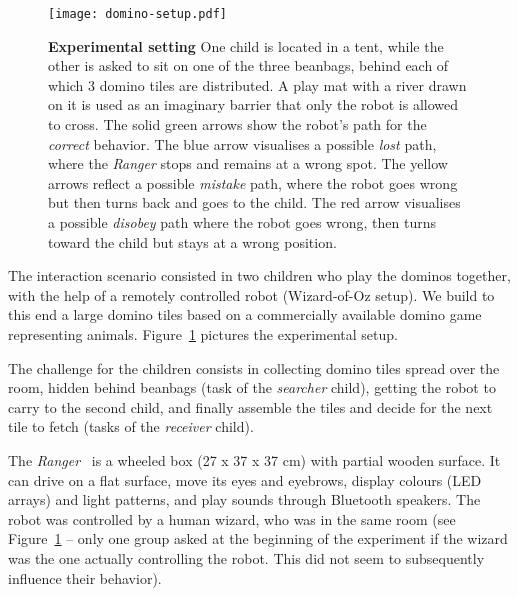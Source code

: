 \documentclass[letterpaper, 10pt, conference]{ieeeconf}
\begin{document}
\begin{figure}[ht!] 
    \centering 
    \texttt{[image: domino-setup.pdf]} 
    \caption{\small \textbf{Experimental setting} One child is located in a
        tent, while the other is asked to sit on one of the three beanbags,
        behind each of which 3 domino tiles are distributed. A play mat with a
        river drawn on it is used as an imaginary barrier that only the robot is
        allowed to cross. The solid green arrows show the robot's path for the
        \textit{correct} behavior. The blue arrow visualises a possible
        \textit{lost} path, where the \emph{Ranger} stops and remains at a wrong spot.
        The yellow arrows reflect a possible \textit{mistake} path, where the
        robot goes wrong but then turns back and goes to the child. The red
        arrow visualises a possible \textit{disobey} path where the robot goes
        wrong, then turns toward the child but stays at a wrong position.} 

    \label{fig:domino-setup} 
\end{figure}


The interaction scenario consisted in two children who play the dominos
together, with the help of a remotely controlled robot (Wizard-of-Oz setup). We
build to this end a large domino tiles based on a commercially available domino
game representing animals.  Figure~\ref{fig:domino-setup} pictures the
experimental setup.

The challenge for the children consists in collecting domino tiles spread over
the room, hidden behind beanbags (task of the \emph{searcher} child), getting
the robot to carry to the second child, and finally assemble the tiles and
decide for the next tile to fetch (tasks of the \emph{receiver} child).

The \emph{Ranger}~\cite{mondada2014ranger} is a wheeled box (27 x 37 x 37 cm) with
partial wooden surface. It can drive on a flat
surface, move its eyes and eyebrows, display colours (LED arrays) and light patterns,
and play sounds through Bluetooth speakers.  The robot was controlled by a human
wizard, who was in the same room (see Figure~\ref{fig:domino-setup} -- only one
group asked at the beginning of the experiment if the wizard was the one
actually controlling the robot. This did not seem to subsequently influence
their behavior).

\end{document}
